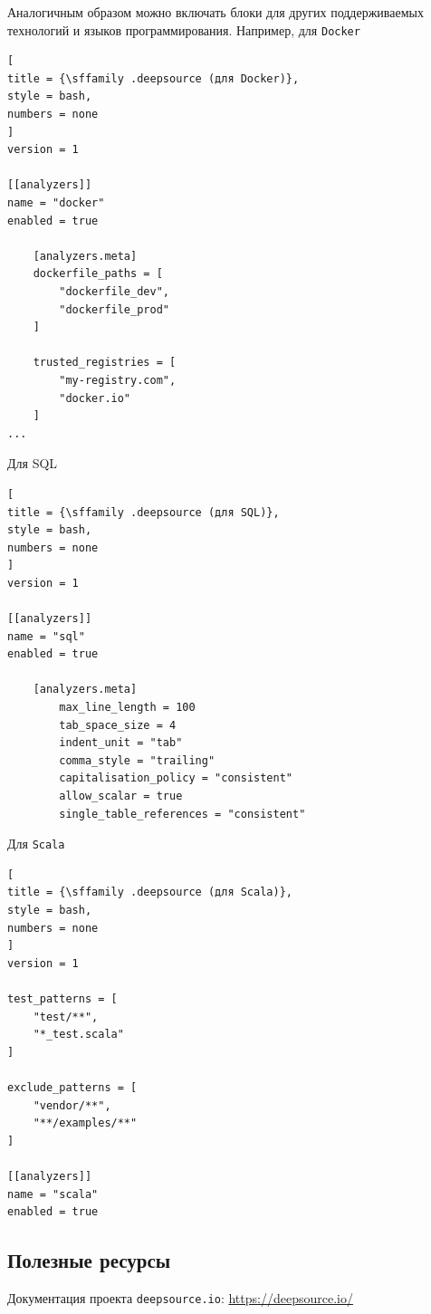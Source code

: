 \documentclass[%
	11pt,
	a4paper,
	utf8,
		]{article}
\begin{document}
Аналогичным образом можно включать блоки для других поддерживаемых технологий и языков программирования. Например, для \texttt{Docker}
\begin{lstlisting}[
title = {\sffamily .deepsource (для Docker)},
style = bash,
numbers = none
]
version = 1

[[analyzers]]
name = "docker"
enabled = true

	[analyzers.meta]
	dockerfile_paths = [
		"dockerfile_dev",
		"dockerfile_prod"
	]

	trusted_registries = [
		"my-registry.com",
		"docker.io"
	]
...
\end{lstlisting}

Для SQL
\begin{lstlisting}[
title = {\sffamily .deepsource (для SQL)},
style = bash,
numbers = none
]
version = 1

[[analyzers]]
name = "sql"
enabled = true

	[analyzers.meta]
		max_line_length = 100
		tab_space_size = 4
		indent_unit = "tab"
		comma_style = "trailing"
		capitalisation_policy = "consistent"
		allow_scalar = true
		single_table_references = "consistent"
\end{lstlisting}

Для \texttt{Scala}
\begin{lstlisting}[
title = {\sffamily .deepsource (для Scala)},
style = bash,
numbers = none
]
version = 1

test_patterns = [
	"test/**",
	"*_test.scala"
]

exclude_patterns = [
	"vendor/**",
	"**/examples/**"
]

[[analyzers]]
name = "scala"
enabled = true
\end{lstlisting}

\subsection{Полезные ресурсы}

Документация проекта \texttt{deepsource.io}: \url{https://deepsource.io/}





\end{document}

